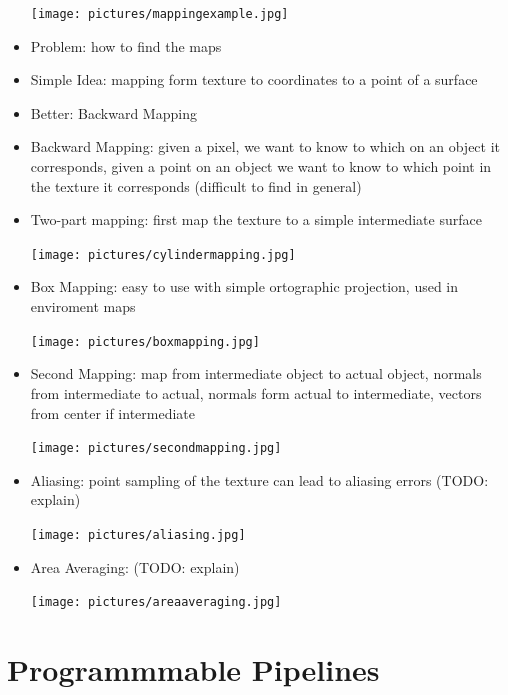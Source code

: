 \documentclass[11pt,a4paper]{article}
\begin{document}
\begin{itemize}
		\begin{center}
			\texttt{[image: pictures/mappingexample.jpg]}
		\end{center}
		\item Problem: how to find the maps
		\item Simple Idea: mapping form texture to coordinates to a point of a surface
		\item Better: Backward Mapping
		\item Backward Mapping: given a pixel, we want to know to which on an object it corresponds, given a point on an object we want to know to which point in the texture it corresponds (difficult to find in general)
		\item Two-part mapping: first map the texture to a simple intermediate surface
		\begin{center}
			\texttt{[image: pictures/cylindermapping.jpg]}
		\end{center}
		\item Box Mapping: easy to use with simple ortographic projection, used in enviroment maps
		\begin{center}
			\texttt{[image: pictures/boxmapping.jpg]}
		\end{center}
		\item Second Mapping: map from intermediate object to actual object, normals from intermediate to actual, normals form actual to intermediate, vectors from center if intermediate
		\begin{center}
			\texttt{[image: pictures/secondmapping.jpg]}
		\end{center}
		\item Aliasing: point sampling of the texture can lead to aliasing errors (TODO: explain)
		\begin{center}
			\texttt{[image: pictures/aliasing.jpg]}
		\end{center}
		\item Area Averaging: (TODO: explain)
		\begin{center}
			\texttt{[image: pictures/areaaveraging.jpg]}
		\end{center}
	\end{itemize}

\section{Programmmable Pipelines}
\end{document}
